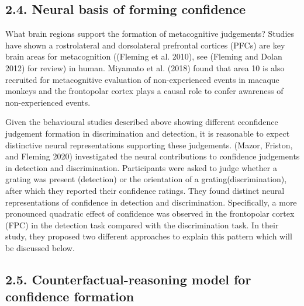 \documentclass[]{article}
\begin{document}
\hypertarget{neural-basis-of-forming-confidence}{%
\subsection{2.4. Neural basis of forming
confidence}\label{neural-basis-of-forming-confidence}}

What brain regions support the formation of metacognitive judgements?
Studies have shown a rostrolateral and dorsolateral prefrontal cortices
(PFCs) are key brain areas for metacognition ((Fleming et al. 2010), see
(Fleming and Dolan 2012) for review) in human. Miyamato et al. (2018)
found that area 10 is also recruited for metacognitive evaluation of
non-experienced events in macaque monkeys and the frontopolar cortex
plays a causal role to confer awareness of non-experienced events.

Given the behavioural studies described above showing different
cconfidence judgement formation in discrimination and detection, it is
reasonable to expect distinctive neural representations supporting these
judgements. (Mazor, Friston, and Fleming 2020) investigated the neural
contributions to confidence judgements in detection and discrimination.
Participants were asked to judge whether a grating was present
(detection) or the orientation of a grating(discrimination), after which
they reported their confidence ratings. They found distinct neural
representations of confidence in detection and discrimination.
Specifically, a more pronounced quadratic effect of confidence was
observed in the frontopolar cortex (FPC) in the detection task compared
with the discrimination task. In their study, they proposed two
different approaches to explain this pattern which will be discussed
below.

\hypertarget{counterfactual-reasoning-model-for-confidence-formation}{%
\subsection{2.5. Counterfactual-reasoning model for confidence
formation}\label{counterfactual-reasoning-model-for-confidence-formation}}
\end{document}
